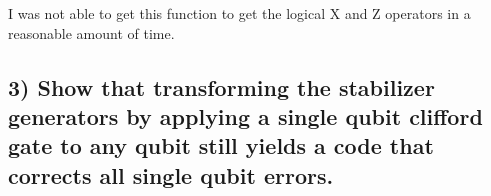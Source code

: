\documentclass[11pt]{article}
\begin{document}
    I was not able to get this function to get the logical X and Z operators
in a reasonable amount of time.

    \hypertarget{show-that-transforming-the-stabilizer-generators-by-applying-a-single-qubit-clifford-gate-to-any-qubit-still-yields-a-code-that-corrects-all-single-qubit-errors.}{%
\subsection{3) Show that transforming the stabilizer generators by
applying a single qubit clifford gate to any qubit still yields a code
that corrects all single qubit
errors.}\label{show-that-transforming-the-stabilizer-generators-by-applying-a-single-qubit-clifford-gate-to-any-qubit-still-yields-a-code-that-corrects-all-single-qubit-errors.}}
\end{document}
